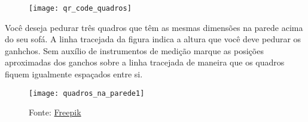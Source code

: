 \documentclass[10 pt,usenames,dvipsnames, oneside]{article}
\begin{document}
\begin{figure}[H]
\centering
\texttt{[image: qr\_code\_quadros]}

\end{figure}

Você deseja pedurar três quadros que têm as mesmas dimensões na parede acima do seu sofá. A linha tracejada da figura indica a altura que você deve pedurar os ganhchos. Sem auxílio de instrumentos de medição marque as posições aproximadas dos ganchos sobre a linha tracejada de maneira que os quadros fiquem igualmente espaçados entre si.

\begin{figure}[H]
\centering
\texttt{[image: quadros\_na\_parede1]}

\caption{Fonte: \href{freepik.com}{Freepik}}

\end{figure}
\end{document}
